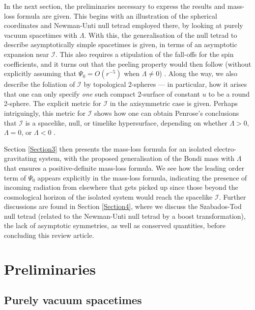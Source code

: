 \documentclass[aps,pre,preprint,superscriptaddress,showpacs,showkeys]{revtex4-1}
\begin{document}
In the next section, the preliminaries necessary to express the results and mass-loss formula are given. This begins with an illustration of the spherical coordinates and Newman-Unti null tetrad employed there, by looking at purely vacuum spacetimes with $\Lambda$. With this, the generalisation of the null tetrad to describe asymptotically simple spacetimes is given, in terms of an asymptotic expansion near $\mathcal{I}$. This also requires a stipulation of the fall-offs for the spin coefficients, and it turns out that the peeling property would then follow (without explicitly assuming that $\Psi_0=O(r^{-5})$ when $\Lambda\neq0$) \cite{Vee2017c}. Along the way, we also describe the foliation of $\mathcal{I}$ by topological 2-spheres \cite{Szabados} --- in particular, how it arises that one can only specify \emph{one} such compact 2-surface of constant $u$ to be a round 2-sphere. The explicit metric for $\mathcal{I}$ in the axisymmetric case is given. Perhaps intriguingly, this metric for $\mathcal{I}$ shows how one can obtain Penrose's conclusions that $\mathcal{I}$ is a spacelike, null, or timelike hypersurface, depending on whether $\Lambda>0$, $\Lambda=0$, or $\Lambda<0$ \cite{Pen65}.

Section \ref{Section3} then presents the mass-loss formula for an isolated electro-gravitating system, with the proposed generalisation of the Bondi mass with $\Lambda$ that ensures a positive-definite mass-loss formula. We see how the leading order term of $\Psi_0$ appears explicitly in the mass-loss formula, indicating the presence of incoming radiation from elsewhere that gets picked up since those beyond the cosmological horizon of the isolated system would reach the spacelike $\mathcal{I}$. Further discussions are found in Section \ref{Section4}, where we discuss the Szabados-Tod null tetrad \cite{Vee2017,Szabados} (related to the Newman-Unti null tetrad by a boost transformation), the lack of asymptotic symmetries, as well as conserved quantities, before concluding this review article.

\section{Preliminaries}\label{Section2}

\subsection{Purely vacuum spacetimes}\label{Section2A}
\end{document}
